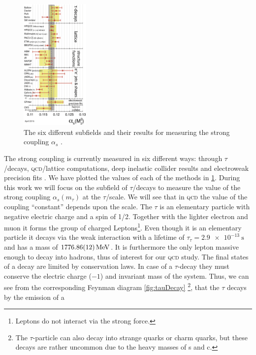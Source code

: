 \documentclass[../../index.tex]{subfiles}
\begin{document}
\begin{figure}
  \includegraphics[width=0.3\textwidth]{./images/alphasDetermination.eps}
  \caption{The six different subfields and their results for measuring the
    strong coupling $\alpha_s$ \cite{PDG2018}.}
  \label{fig:alphaSDetermination}
\end{figure}
The strong coupling is currently measured in six different ways: through
$\tau$\-/decays, \textsc{qcd}\-/lattice computations, deep inelastic collider
results and electroweak precision fits \cite{PDG2018}. We have plotted the
values of each of the methods in \cref{fig:alphaSDetermination}. During this
work we will focus on the subfield of $\tau$\-/decays to measure the value of
the strong coupling $\alpha_s(m_\tau)$ at the $\tau$\-/scale. We will see that
in \textsc{qcd} the value of the coupling ``constant'' depends upon the scale.
The $\tau$ is an elementary particle with negative electric charge and a spin of
1/2. Together with the lighter electron and muon it forms the group of charged
Leptons\footnote{Leptons do not interact via the strong force.}. Even though it
is an elementary particle it decays via the weak interaction with a lifetime of
$\tau_\tau=\SI{2.9e-13}{\second}$ and has a mass of
$\SI{1776.86\pm0.12}{\mega\electronvolt}$\cite{PDG2018}. It is furthermore the
only lepton massive enough to decay into hadrons, thus of interest for our
\textsc{qcd} study. The final states of a decay are limited by conservation
laws. In case of a $\tau$-decay they must conserve the electric charge ($-1$)
and invariant mass of the system. Thus, we can see from the corresponding
Feynman diagram \cref{fig:tauDecay} \footnote{The $\tau$-particle can also decay
  into strange quarks or charm quarks, but these decays are rather uncommon due
  to the heavy masses of s and c.}, that the $\tau$ decays by the emission of a
\end{document}
